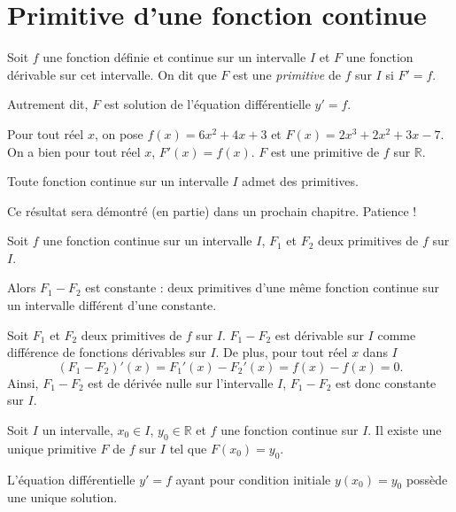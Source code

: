 \documentclass[11pt,fleqn, openany]{book} %
\begin{document}
\section{Primitive d'une fonction continue}



\begin{definition}Soit $f$ une fonction définie et continue sur un intervalle $I$ et $F$ une fonction dérivable sur cet intervalle. On dit que $F$ est une \textit{primitive} de $f$ sur $I$ si $F'=f$. 

Autrement dit, $F$ est solution de l'équation différentielle $y'=f$.\end{definition}


\begin{example} Pour tout réel $x$, on pose $f(x)=6x^2+4x+3$ et $F(x)=2x^3+2x^2+3x-7$. On a bien pour tout réel $x$, $F'(x)=f(x)$. $F$ est une primitive de $f$ sur $\mathbb{R}$.\end{example}



\begin{theorem}Toute fonction continue sur un intervalle $I$ admet des primitives.\end{theorem}

Ce résultat sera démontré (en partie) dans un prochain chapitre. Patience !

\begin{proposition}Soit $f$ une fonction continue sur un intervalle $I$, $F_1$ et $F_2$ deux primitives de $f$ sur $I$. 

Alors $F_1-F_2$ est constante : deux primitives d'une même fonction continue sur un intervalle différent d'une constante.\end{proposition}

\begin{demonstration} Soit $F_1$ et $F_2$ deux primitives de $f$ sur $I$.
$F_1-F_2$ est dérivable sur $I$ comme différence de fonctions dérivables sur $I$. De plus, pour tout réel $x$ dans $I$
\[ (F_1-F_2)'(x)=F_1'(x)-F_2'(x)=f(x)-f(x)=0.\]
Ainsi, $F_1-F_2$ est de dérivée nulle sur l'intervalle $I$, $F_1-F_2$ est donc constante sur $I$.\end{demonstration}

\begin{proposition}Soit $I$ un intervalle, $x_0\in I$, $y_0 \in \mathbb{R}$ et $f$ une fonction continue sur $I$. Il existe une unique primitive $F$ de $f$ sur $I$ tel que $F(x_0)=y_0$.

L'équation différentielle $y'=f$ ayant pour condition initiale $y(x_0)=y_0$ possède une unique solution.\end{proposition}
\end{document}
